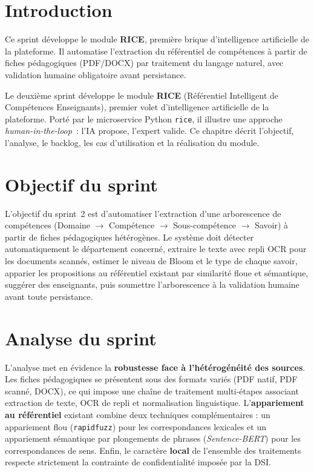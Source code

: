 \documentclass[12pt,a4paper]{report}
\begin{document}
\section{Introduction}

\begin{summaryframe}[frametitle={En bref — Sprint 2}]
Ce sprint développe le module \textbf{RICE}, première brique d'intelligence
artificielle de la plateforme. Il automatise l'extraction du référentiel de
compétences à partir de fiches pédagogiques (PDF/DOCX) par traitement du
langage naturel, avec validation humaine obligatoire avant persistance.
\end{summaryframe}

Le deuxième sprint développe le module \textbf{RICE} (Référentiel
Intelligent de Compétences Enseignants), premier volet d'intelligence
artificielle de la plateforme. Porté par le microservice Python \texttt{rice}, il illustre une
approche \textit{human-in-the-loop}~: l'IA propose, l'expert valide. Ce chapitre
décrit l'objectif, l'analyse, le backlog, les cas d'utilisation et la
réalisation du module.

\section{Objectif du sprint}

L'objectif du sprint~2 est d'automatiser l'extraction d'une arborescence de
compétences (Domaine $\rightarrow$ Compétence $\rightarrow$ Sous-compétence
$\rightarrow$ Savoir) à partir de fiches pédagogiques hétérogènes. Le système
doit détecter automatiquement le département concerné, extraire le texte avec
repli OCR pour les documents scannés, estimer le niveau de Bloom et le type de
chaque savoir, apparier les propositions au référentiel existant par similarité
floue et sémantique, suggérer des enseignants, puis soumettre l'arborescence à
la validation humaine avant toute persistance.

\section{Analyse du sprint}

L'analyse met en évidence la \textbf{robustesse face à l'hétérogénéité des
sources}. Les fiches pédagogiques se présentent sous des formats variés (PDF
natif, PDF scanné, DOCX), ce qui impose une chaîne de traitement multi-étapes
associant extraction de texte, OCR de repli et normalisation linguistique.
L'\textbf{appariement au référentiel} existant combine deux techniques
complémentaires : un appariement flou (\texttt{rapidfuzz}) pour les
correspondances lexicales et un appariement sémantique par plongements de
phrases (\textit{Sentence-BERT}) pour les correspondances de sens. Enfin, le
caractère \textbf{local} de l'ensemble des traitements respecte strictement la
contrainte de confidentialité imposée par la DSI.
\end{document}
